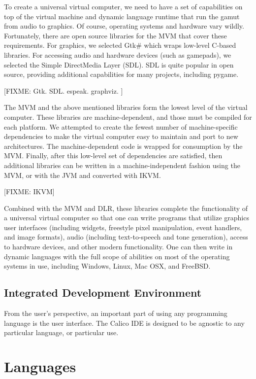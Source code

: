 \documentclass[preprint]{sigplanconf}
\begin{document}
To create a universal virtual computer, we need to have a set of
capabilities on top of the virtual machine and dynamic language
runtime that run the gamut from audio to graphics. Of course,
operating systems and hardware vary wildly. Fortunately, there are
open source libraries for the MVM that cover these requirements. For
graphics, we selected Gtk\# which wraps low-level C-based
libraries. For accessing audio and hardware devices (such as
gamepads), we selected the Simple DirectMedia Layer (SDL). SDL is
quite popular in open source, providing additional capabilities for
many projects, including pygame.

[FIXME: Gtk. SDL. espeak. graphviz. ]

The MVM and the above mentioned libraries form the lowest level of the
virtual computer. These libraries are machine-dependent, and those
must be compiled for each platform. We attempted to create the fewest
number of machine-specific dependencies to make the virtual computer
easy to maintain and port to new architectures. The machine-dependent
code is wrapped for consumption by the MVM. Finally, after this
low-level set of dependencies are satisfied, then additional libraries
can be written in a machine-independent fashion using the MVM, or with
the JVM and converted with IKVM.

[FIXME: IKVM]

Combined with the MVM and DLR, these libraries complete the
functionality of a universal virtual computer so that one can write
programs that utilize graphics user interfaces (including widgets,
freestyle pixel manipulation, event handlers, and image formats),
audio (including text-to-speech and tone generation), access to
hardware devices, and other modern functionality. One can then write
in dynamic languages with the full scope of abilities on most of the
operating systems in use, including Windows, Linux, Mac OSX, and
FreeBSD.

\subsection{Integrated Development Environment}

From the user's perspective, an important part of using any
programming language is the user interface. The Calico IDE is designed
to be agnostic to any particular language, or particular use.

\section{Languages}
\end{document}

